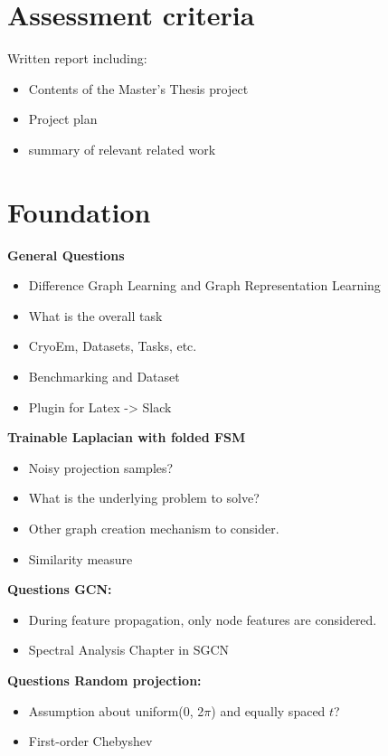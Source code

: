 \chapter{Assessment criteria}
Written report including: 
\begin{itemize}
    \item Contents of the Master's Thesis project
    \item Project plan
    \item summary of relevant related work
\end{itemize}

\chapter{Foundation}

\textbf{General Questions}
\begin{itemize}
    \item Difference Graph Learning and Graph Representation Learning
    \item What is the overall task
    \item CryoEm, Datasets, Tasks, etc.
    \item Benchmarking and Dataset
    \item Plugin for Latex -> Slack
\end{itemize}

\textbf{Trainable Laplacian with folded FSM}
\begin{itemize}
    \item Noisy projection samples?
    \item What is the underlying problem to solve?
    \item Other graph creation mechanism to consider.
    \item Similarity measure
\end{itemize}

\textbf{Questions GCN:}
\begin{itemize}
    \item During feature propagation, only node features are considered.
    \item Spectral Analysis Chapter in SGCN
\end{itemize}

\textbf{Questions Random projection:}
\begin{itemize}
    \item Assumption about uniform(0, 2$\pi$) and equally spaced $t$?
    \item First-order Chebyshev
\end{itemize}

